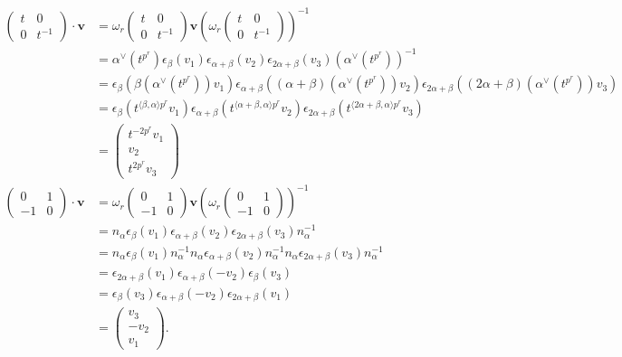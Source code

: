 \begin{align*}
\left(\begin{matrix} t & 0 \\ 0 & t^{-1}\end{matrix}\right) \cdot \mathbf{v}
&=
\omega_r\left(\begin{matrix}t & 0 \\ 0 & t^{-1}\end{matrix}\right) \mathbf{v} \left(\omega_r\left(\begin{matrix}t & 0 \\ 0 & t^{-1}\end{matrix}\right)\right)^{-1} \\
&=
\alpha^\vee(t^{p^r})\epsilon_\beta(v_1)\epsilon_{\alpha+\beta}(v_2)\epsilon_{2\alpha+\beta}(v_3)\left(\alpha^\vee(t^{p^r})\right)^{-1} \\
&=
\epsilon_\beta\left(\beta(\alpha^\vee(t^{p^r}))v_1\right)\epsilon_{\alpha+\beta}\left((\alpha+\beta)(\alpha^\vee(t^{p^r}))v_2\right)\epsilon_{2\alpha+\beta}\left((2\alpha+\beta)(\alpha^\vee(t^{p^r}))v_3\right) \\
&=
\epsilon_\beta\left(t^{\langle\beta,\alpha\rangle p^r}v_1\right)\epsilon_{\alpha+\beta}\left(t^{\langle\alpha+\beta,\alpha\rangle p^r}v_2\right)\epsilon_{2\alpha+\beta}\left(t^{\langle2\alpha+\beta,\alpha\rangle p^r}v_3\right) \\
&=
\left(\begin{matrix} t^{-2p^r}v_1 \\ v_2 \\ t^{2p^r}v_3 \end{matrix}\right) \\
\left(\begin{matrix} 0 & 1 \\ -1 & 0 \end{matrix}\right) \cdot \mathbf{v} 
&=
\omega_r\left(\begin{matrix} 0 & 1 \\ -1 & 0\end{matrix}\right) \mathbf{v}\left( \omega_r\left(\begin{matrix} 0 & 1 \\ -1 & 0\end{matrix}\right)\right)^{-1} \\
&= 
n_ \alpha  \epsilon_ \beta (v_1)\epsilon_{\alpha+\beta}(v_2) \epsilon_{2\alpha+\beta}(v_3) n_ \alpha^{-1}\\
&= 
n_ \alpha  \epsilon_\beta (v_1) n_ \alpha^{-1}n_ \alpha \epsilon_{\alpha+\beta}(v_2) n_ \alpha^{-1} n_ \alpha \epsilon_{2\alpha+\beta}(v_3) n_ \alpha^{-1}\\
&= 
\epsilon_{2\alpha+\beta} (v_1) \epsilon_{\alpha+\beta}(-v_2)  \epsilon_{\beta}(v_3) \\
&= 
\epsilon_{\beta}(v_3) \epsilon_{\alpha+\beta}(-v_2) \epsilon_{2\alpha+\beta} (v_1)\\
&= \left(\begin{matrix} v_3 \\ -v_2 \\ v_1 \end{matrix}\right).
\end{align*}
